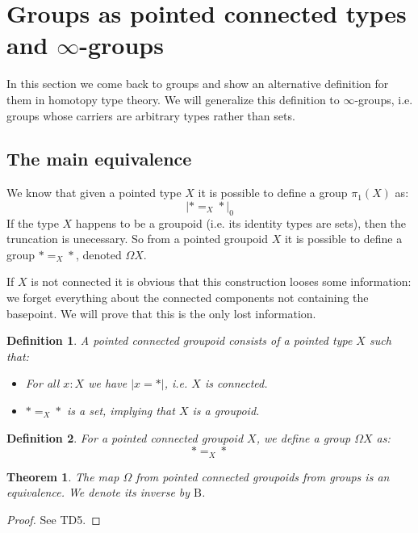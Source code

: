 \documentclass{article}
\newcommand{\se}[1]{\medbreak \medbreak \section{#1}}
\newcommand{\sse}[1]{\medbreak \subsection{#1}}
\newcommand{\B}{\mathrm{B}}
\newtheorem{definition}{Definition}
\newtheorem{theorem}{Theorem}
\begin{document}




\se{Groups as pointed connected types and $\infty$-groups}

In this section we come back to groups and show an alternative definition for them in homotopy type theory. We will generalize this definition to $\infty$-groups, i.e. groups whose carriers are arbitrary types rather than sets.


\sse{The main equivalence}

We know that given a pointed type $X$ it is possible to define a group $\pi_1(X)$ as: 
\[|*=_X*|_0\] If the type $X$ happens to be a groupoid (i.e. its identity types are sets), then the truncation is unecessary. So from a pointed groupoid $X$ it is possible to define a group $*=_X*$, denoted $\Omega X$. 

If $X$ is not connected it is obvious that this construction looses some information: we forget everything about the connected components not containing the basepoint. We will prove that this is the only lost information.

\begin{definition}
A pointed connected groupoid consists of a pointed type $X$ such that:
\begin{itemize}
\item For all $x:X$ we have $|x=*|$, i.e. $X$ is connected.
\item $*=_{X}*$ is a set, implying that $X$ is a groupoid.
\end{itemize}
\end{definition}

\begin{definition}
For a pointed connected groupoid $X$, we define a group $\Omega X$ as:
\[*=_X*\]
\end{definition}

\begin{theorem}
The map $\Omega$ from pointed connected groupoids from groups is an equivalence. We denote its inverse by $\B$.
\end{theorem}
\begin{proof}
See TD5.
\end{proof}
\end{document}
